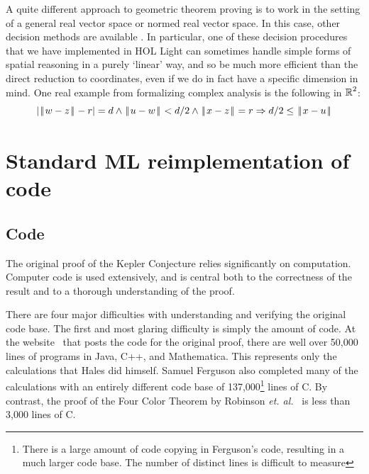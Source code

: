 \documentclass[11pt]{amsart}
\def\|{{\hskip0.1em|\hskip-0.15em|\hskip0.1em}}
\newcommand{\real}{\mbox{$\protect\mathbb R$}}
\let\And=\wedge                    %
\newcommand{\Imp}{\Rightarrow}
\begin{document}
A quite different approach to geometric theorem proving is to work in the
setting of a general real vector space or normed real vector space. In this
case, other decision methods are available \cite{solovay-jointpaper}. In
particular, one of these decision procedures that we have implemented in HOL
Light can sometimes handle simple forms of spatial reasoning in a purely
`linear' way, and so be much more efficient than the direct reduction to
coordinates, even if we do in fact have a specific dimension in mind. One
real example from formalizing complex analysis is the following in $\real^2$:
$$ |\|w - z\| - r| = d \And \|u - w\| < d/2 \And \|x - z\| = r
   \Imp d/2 \leq \|x - u\|
$$




\section{Standard ML reimplementation of code}
\label{sec:code}

\subsection*{Code}

The original proof of the Kepler
Conjecture relies significantly
on computation. Computer code is used extensively, and is
central both to the correctness of the result and to a thorough
understanding of the proof. 

  There are four major difficulties with understanding and verifying
the original code base. The first and most glaring difficulty is
simply the amount of code. At the website~\cite{website:Hales:1998:Code}
that posts the code for the original proof,
there are well over 50,000 lines of programs in Java, C++, and
Mathematica. This represents only the calculations that Hales did himself.
Samuel Ferguson also completed many of the calculations with an entirely
different code base of 137,000\footnote{There is a large amount of
code copying in Ferguson's code, resulting in a much larger code base.
The number of distinct lines is difficult to measure} lines of C. By
contrast, the proof of the Four Color Theorem by Robinson \textit{et.
al.}~\cite{Robertson:1997:JCTB} is less than 3,000 lines of C.
\end{document}
